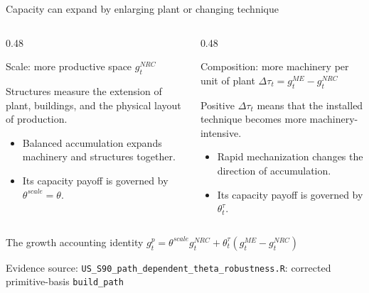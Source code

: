 \documentclass[10pt,aspectratio=169]{beamer}
\newcommand{\sourcefooter}[1]{%
  \par\vfill{\tiny\color{gray!70}Evidence source: #1}\vspace{-0.35em}}
\begin{document}
\begin{frame}{Capacity can expand by enlarging plant or changing technique}
  \begin{columns}[T,onlytextwidth]
    \begin{column}{0.48\textwidth}
      \begin{block}{Scale: more productive space}
        \centering
        \Large $g_t^{NRC}$

        \vspace{0.5em}\normalsize
        Structures measure the extension of plant, buildings, and the physical layout of production.
      \end{block}
      \begin{itemize}\small
        \item Balanced accumulation expands machinery and structures together.
        \item Its capacity payoff is governed by $\theta^{scale}=\theta$.
      \end{itemize}
    \end{column}
    \begin{column}{0.48\textwidth}
      \begin{block}{Composition: more machinery per unit of plant}
        \centering
        \Large $\Delta\tau_t=g_t^{ME}-g_t^{NRC}$

        \vspace{0.5em}\normalsize
        Positive $\Delta\tau_t$ means that the installed technique becomes more machinery-intensive.
      \end{block}
      \begin{itemize}\small
        \item Rapid mechanization changes the direction of accumulation.
        \item Its capacity payoff is governed by $\theta_t^{\tau}$.
      \end{itemize}
    \end{column}
  \end{columns}
  \begin{block}{The growth accounting identity}
    \centering
    \Large $g_t^p=\theta^{scale}g_t^{NRC}+\theta_t^{\tau}(g_t^{ME}-g_t^{NRC})$
  \end{block}
  \sourcefooter{\texttt{US\_S90\_path\_dependent\_theta\_robustness.R}: corrected primitive-basis \texttt{build\_path}}
\end{frame}
\end{document}
